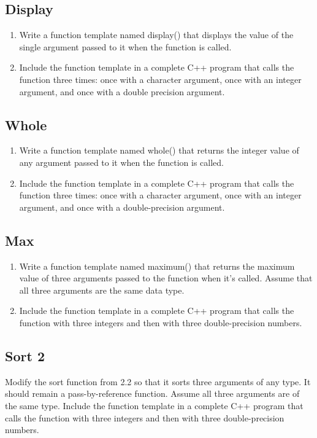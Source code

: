 \documentclass{article}
\begin{document}
\subsection{Display}
\begin{enumerate}
\item Write a function template named display() that displays the value of the single argument passed to it when the function is called.
\item Include the function template in a complete C++ program that calls the function three times: once with a character argument, once with an integer argument, and once with a double precision argument.
\end{enumerate}

\subsection{Whole}
\begin{enumerate}
\item Write a function template named whole() that returns the integer value of any argument passed to it when the function is called.
\item Include the function template  in a complete C++ program that calls the function three times: once with a character argument, once with an integer argument, and once with a double-precision argument.
\end{enumerate}

\subsection{Max}
\begin{enumerate}
\item Write a function template named maximum() that returns the maximum value of three arguments passed to the function when it’s called. Assume that all three arguments are the same data type.
\item Include the function template in a complete C++ program that calls the function with three integers and then with three double-precision numbers.
\end{enumerate}

\subsection{Sort 2}
Modify the sort function from 2.2 so that it sorts three arguments of any type. It should remain a pass-by-reference function. Assume all three arguments are of the same type. Include the function template in a complete C++ program that calls the function with three integers and then with three double-precision numbers. 
\end{document}
